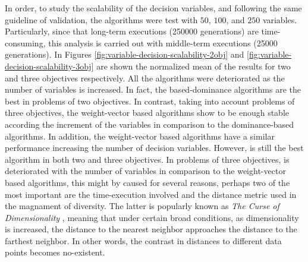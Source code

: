 In order, to study the scalability of the decision variables, and following the same guideline of validation, the algorithms were test with $50$, $100$, and $250$ variables.
%
Particularly, since that long-term executions (250000 generations) are time-consuming, this analysis is carried out with middle-term executions (25000 generations).
%
In Figures \ref{fig:variable-decision-scalability-2obj} and \ref{fig:variable-decision-scalability-3obj} are shown the normalized mean of the \HV{} results for two and three objectives respectively.
%
All the algorithms were deteriorated as the number of variables is increased.
%
In fact, the based-dominance algorithms are the best in problems of two objectives.
%
In contrast, taking into account problems of three objectives, the weight-vector based algorithms show to be enough stable according the increment of the variables in comparison to the dominance-based algorithms.
%
In addition, the weight-vector based algorithms have a similar performance increasing the number of decision variables.
%
However, \VSDMOEA{} is still the best algorithm in both two and three objectives.
% 
In problems of three objectives, \VSDMOEA{} is deteriorated with the number of variables in comparison to the weight-vector based algorithms, this might by caused for several reasons, perhaps two of the most important are the time-execution involved and the distance metric used in the magnament of diversity.
%
The latter is popularly known as \textit{The Curse of Dimensionality} \cite{trunk1979problem, beyer1999nearest}, meaning that under certain broad conditions, as dimensionality is increased, the distance to the nearest neighbor approaches the distance to the farthest neighbor.
%
In other words, the contrast in distances to different data points becomes no-existent.


%

%



